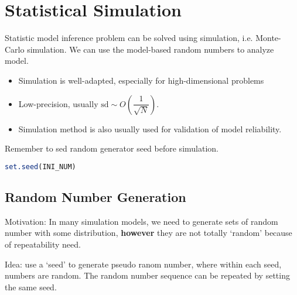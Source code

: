         
        
        

\section{Statistical Simulation}\label{SubSectionStatisticalSimulation}
    Statistic model inference problem can be solved using simulation, i.e. Monte-Carlo simulation. We can use the model-based random numbers to analyze model.
\begin{itemize}[topsep=2pt,itemsep=0pt]
    \item Simulation is well-adapted, especially for high-dimensional problems
    \item Low-precision, usually $ \mathrm{sd} \sim O(\dfrac{1}{\sqrt{N}}) $. 
    \item Simulation method is also usually used for validation of model reliability.
\end{itemize}

\begin{rcode}
    Remember to sed random generator seed before simulation.
\begin{lstlisting}[language=R]
set.seed(INI_NUM)
\end{lstlisting}
\end{rcode}
    
\subsection{Random Number Generation}\label{SubSectionRandomNumberGeneration}
    Motivation: In many simulation models, we need to generate sets of random number with some distribution, \textbf{however} they are not totally `random' because of repeatability need. 

    Idea: use a `seed' to generate pseudo ranom number, where within each seed, numbers are random. The random number sequence can be repeated by setting the same seed.



